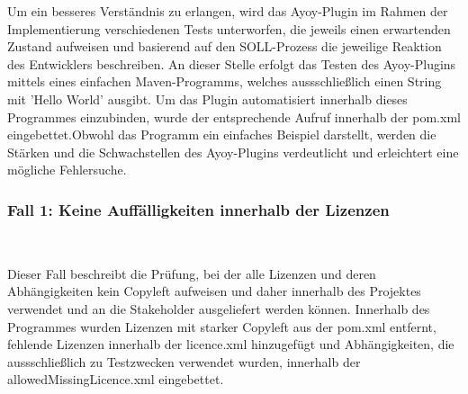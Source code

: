 Um ein besseres Verständnis zu erlangen, wird das Ayoy-Plugin im Rahmen der Implementierung verschiedenen Tests unterworfen, die jeweils einen erwartenden Zustand aufweisen und basierend auf den SOLL-Prozess die jeweilige Reaktion des Entwicklers beschreiben. An dieser Stelle erfolgt das Testen des Ayoy-Plugins mittels eines einfachen Maven-Programms, welches aussschließlich einen String mit 'Hello World' ausgibt. Um das Plugin automatisiert innerhalb dieses Programmes einzubinden, wurde der entsprechende Aufruf innerhalb der pom.xml eingebettet.Obwohl das Programm ein einfaches Beispiel darstellt, werden die Stärken und die Schwachstellen des Ayoy-Plugins verdeutlicht und erleichtert eine mögliche Fehlersuche. 

\subsubsection{Fall 1: Keine Auffälligkeiten innerhalb der Lizenzen}$~$

Dieser Fall beschreibt die Prüfung, bei der alle Lizenzen und deren Abhängigkeiten kein Copyleft aufweisen und daher innerhalb des Projektes verwendet und an die Stakeholder ausgeliefert werden können. Innerhalb des Programmes wurden Lizenzen mit starker Copyleft aus der pom.xml entfernt, fehlende Lizenzen innerhalb der licence.xml hinzugefügt und Abhängigkeiten, die aussschließlich zu Testzwecken verwendet wurden, innerhalb der allowedMissingLicence.xml eingebettet.  

